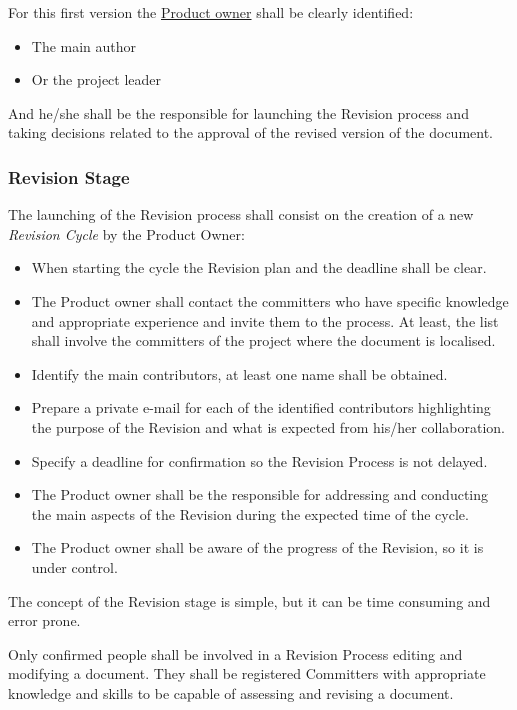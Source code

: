 \documentclass{template/openetcs_article}
\begin{document}
For this first version the \underline{Product owner} shall be clearly identified:
\begin{itemize}
\item The main author 
\item Or the project leader 
\end{itemize}

And he/she shall be the responsible for launching the Revision process and taking decisions related to the approval of the revised version of the document.

\subsubsection{Revision Stage}

The launching of the Revision process shall consist on the creation of a new {\it Revision Cycle} by the Product Owner:
\begin{itemize}
\item When starting the cycle the Revision plan and the deadline shall be clear.  
\item The Product owner shall contact the committers who have specific knowledge and appropriate experience and invite them to the process. At least, the list shall involve the committers of the project where the document is localised.
\item Identify the main contributors, at least one name shall be obtained.
\item Prepare a private e-mail for each of the identified contributors highlighting the purpose of the Revision and what is expected from his/her collaboration.
\item Specify a deadline for confirmation so the Revision Process is not delayed.
\item The Product owner shall be the responsible for addressing and conducting the main aspects of the Revision during the expected time of the cycle. 
\item The Product owner shall be aware of the progress of the Revision, so it is under control. 
\end{itemize}

The concept of the Revision stage is simple, but it can be time consuming and error prone.

Only confirmed people shall be involved in a Revision Process editing and modifying a document. They shall be registered Committers with appropriate knowledge and skills to be capable of assessing and revising a document. 
\end{document}
